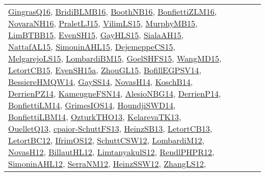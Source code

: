 {\begin{longtable}{lp{3cm}>{\raggedright}p{6cm}>{\raggedright}p{6cm}p{8cm}}
\href{papers/GingrasQ16.pdf}{GingrasQ16}\cite{GingrasQ16}, \href{articles/BridiBLMB16.pdf}{BridiBLMB16}\cite{BridiBLMB16}, \href{papers/BoothNB16.pdf}{BoothNB16}\cite{BoothNB16}, \href{papers/BonfiettiZLM16.pdf}{BonfiettiZLM16}\cite{BonfiettiZLM16}, \href{articles/NovaraNH16.pdf}{NovaraNH16}\cite{NovaraNH16}, \href{papers/PraletLJ15.pdf}{PraletLJ15}\cite{PraletLJ15}, \href{papers/VilimLS15.pdf}{VilimLS15}\cite{VilimLS15}, \href{papers/MurphyMB15.pdf}{MurphyMB15}\cite{MurphyMB15}, \href{papers/LimBTBB15.pdf}{LimBTBB15}\cite{LimBTBB15}, \href{papers/EvenSH15.pdf}{EvenSH15}\cite{EvenSH15}, \href{papers/GayHLS15.pdf}{GayHLS15}\cite{GayHLS15}, \href{papers/SialaAH15.pdf}{SialaAH15}\cite{SialaAH15}, \href{articles/NattafAL15.pdf}{NattafAL15}\cite{NattafAL15}, \href{articles/SimoninAHL15.pdf}{SimoninAHL15}\cite{SimoninAHL15}, \href{papers/DejemeppeCS15.pdf}{DejemeppeCS15}\cite{DejemeppeCS15}, \href{papers/MelgarejoLS15.pdf}{MelgarejoLS15}\cite{MelgarejoLS15}, \href{papers/LombardiBM15.pdf}{LombardiBM15}\cite{LombardiBM15}, \href{articles/GoelSHFS15.pdf}{GoelSHFS15}\cite{GoelSHFS15}, \href{articles/WangMD15.pdf}{WangMD15}\cite{WangMD15}, \href{articles/LetortCB15.pdf}{LetortCB15}\cite{LetortCB15}, \href{articles/EvenSH15a.pdf}{EvenSH15a}\cite{EvenSH15a}, \href{papers/ZhouGL15.pdf}{ZhouGL15}\cite{ZhouGL15}, \href{papers/BofillEGPSV14.pdf}{BofillEGPSV14}\cite{BofillEGPSV14}, \href{papers/BessiereHMQW14.pdf}{BessiereHMQW14}\cite{BessiereHMQW14}, \href{papers/GaySS14.pdf}{GaySS14}\cite{GaySS14}, \href{articles/NovasH14.pdf}{NovasH14}\cite{NovasH14}, \href{papers/KoschB14.pdf}{KoschB14}\cite{KoschB14}, \href{papers/DerrienPZ14.pdf}{DerrienPZ14}\cite{DerrienPZ14}, \href{articles/KameugneFSN14.pdf}{KameugneFSN14}\cite{KameugneFSN14}, \href{papers/AlesioNBG14.pdf}{AlesioNBG14}\cite{AlesioNBG14}, \href{papers/DerrienP14.pdf}{DerrienP14}\cite{DerrienP14}, \href{papers/BonfiettiLM14.pdf}{BonfiettiLM14}\cite{BonfiettiLM14}, \href{articles/GrimesIOS14.pdf}{GrimesIOS14}\cite{GrimesIOS14}, \href{papers/HoundjiSWD14.pdf}{HoundjiSWD14}\cite{HoundjiSWD14}, \href{articles/BonfiettiLBM14.pdf}{BonfiettiLBM14}\cite{BonfiettiLBM14}, \href{articles/OzturkTHO13.pdf}{OzturkTHO13}\cite{OzturkTHO13}, \href{papers/KelarevaTK13.pdf}{KelarevaTK13}\cite{KelarevaTK13}, \href{papers/OuelletQ13.pdf}{OuelletQ13}\cite{OuelletQ13}, \href{papers/cpaior-SchuttFS13.pdf}{cpaior-SchuttFS13}\cite{cpaior-SchuttFS13}, \href{articles/HeinzSB13.pdf}{HeinzSB13}\cite{HeinzSB13}, \href{papers/LetortCB13.pdf}{LetortCB13}\cite{LetortCB13}, \href{papers/LetortBC12.pdf}{LetortBC12}\cite{LetortBC12}, \href{papers/IfrimOS12.pdf}{IfrimOS12}\cite{IfrimOS12}, \href{papers/SchuttCSW12.pdf}{SchuttCSW12}\cite{SchuttCSW12}, \href{articles/LombardiM12.pdf}{LombardiM12}\cite{LombardiM12}, \href{articles/NovasH12.pdf}{NovasH12}\cite{NovasH12}, \href{papers/BillautHL12.pdf}{BillautHL12}\cite{BillautHL12}, \href{articles/LimtanyakulS12.pdf}{LimtanyakulS12}\cite{LimtanyakulS12}, \href{papers/RendlPHPR12.pdf}{RendlPHPR12}\cite{RendlPHPR12}, \href{papers/SimoninAHL12.pdf}{SimoninAHL12}\cite{SimoninAHL12}, \href{papers/SerraNM12.pdf}{SerraNM12}\cite{SerraNM12}, \href{articles/HeinzSSW12.pdf}{HeinzSSW12}\cite{HeinzSSW12}, \href{papers/ZhangLS12.pdf}{ZhangLS12}\cite{ZhangLS12}, 
\end{longtable}}
